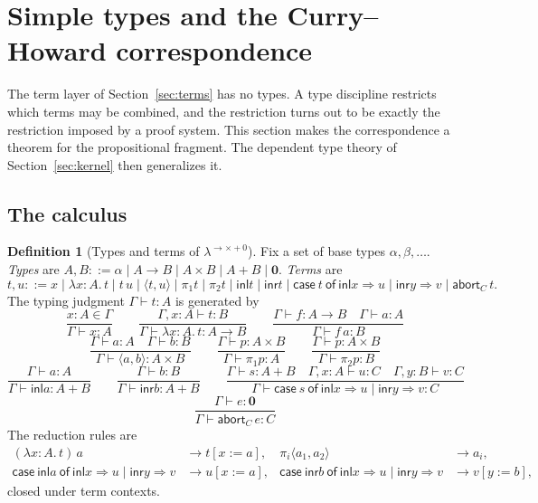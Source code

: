 \documentclass[11pt]{article}
\newcommand{\subst}[3]{#1[#2:=#3]}
\theoremstyle{definition}
\newtheorem{definition}{Definition}[section]
\theoremstyle{plain}
\theoremstyle{remark}
\begin{document}
\newcommand{\inl}{\mathsf{inl}}
\newcommand{\inr}{\mathsf{inr}}
\newcommand{\abort}{\mathsf{abort}}
\newcommand{\pr}{\pi}

\section{Simple types and the Curry--Howard correspondence}\label{sec:ch}

The term layer of Section~\ref{sec:terms} has no types. A type discipline restricts which terms may be combined, and the restriction turns out to be exactly the restriction imposed by a proof system. This section makes the correspondence a theorem for the propositional fragment. The dependent type theory of Section~\ref{sec:kernel} then generalizes it.

\subsection{The calculus}

\begin{definition}[Types and terms of $\lambda^{\to\times+0}$]\label{def:stlc}
Fix a set of base types $\alpha,\beta,\dots$. \emph{Types} are $A,B::=\alpha\mid A\to B\mid A\times B\mid A+B\mid\mathbf 0$. \emph{Terms} are
\[
t,u::=x\mid\lambda x{:}A.\,t\mid t\,u\mid\langle t,u\rangle\mid\pr_1t\mid\pr_2t\mid\inl t\mid\inr t\mid\mathsf{case}\ t\ \mathsf{of}\ \inl x\Rightarrow u\mid\inr y\Rightarrow v\mid\abort_C\,t .
\]
The typing judgment $\Gamma\vdash t:A$ is generated by
\[
\frac{x{:}A\in\Gamma}{\Gamma\vdash x:A}\qquad
\frac{\Gamma,x{:}A\vdash t:B}{\Gamma\vdash\lambda x{:}A.\,t:A\to B}\qquad
\frac{\Gamma\vdash f:A\to B\quad\Gamma\vdash a:A}{\Gamma\vdash f\,a:B}
\]
\[
\frac{\Gamma\vdash a:A\quad\Gamma\vdash b:B}{\Gamma\vdash\langle a,b\rangle:A\times B}\qquad
\frac{\Gamma\vdash p:A\times B}{\Gamma\vdash\pr_1p:A}\qquad
\frac{\Gamma\vdash p:A\times B}{\Gamma\vdash\pr_2p:B}
\]
\[
\frac{\Gamma\vdash a:A}{\Gamma\vdash\inl a:A+B}\qquad
\frac{\Gamma\vdash b:B}{\Gamma\vdash\inr b:A+B}\qquad
\frac{\Gamma\vdash s:A+B\quad\Gamma,x{:}A\vdash u:C\quad\Gamma,y{:}B\vdash v:C}{\Gamma\vdash\mathsf{case}\ s\ \mathsf{of}\ \inl x\Rightarrow u\mid\inr y\Rightarrow v:C}
\]
\[
\frac{\Gamma\vdash e:\mathbf 0}{\Gamma\vdash\abort_C\,e:C}
\]
The reduction rules are
\begin{align*}
(\lambda x{:}A.\,t)\,a&\to\subst{t}{x}{a}, & \pr_i\langle a_1,a_2\rangle&\to a_i,\\
\mathsf{case}\ \inl a\ \mathsf{of}\ \inl x\Rightarrow u\mid\inr y\Rightarrow v&\to\subst{u}{x}{a}, &
\mathsf{case}\ \inr b\ \mathsf{of}\ \inl x\Rightarrow u\mid\inr y\Rightarrow v&\to\subst{v}{y}{b},
\end{align*}
closed under term contexts.
\end{definition}
\end{document}
